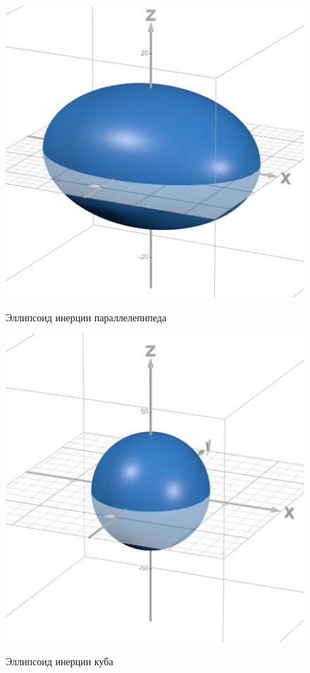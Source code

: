 \documentclass[a4paper,12pt]{article} %
\begin{document}
\begin{enumerate}
\begin{figure} [H] \center
	\includegraphics[scale=0.5]{data/elipse.png}
	\label{pic:4} \caption[Рис. 4]{Эллипсоид инерции параллелепипеда}
	\includegraphics[scale=0.5]{data/elipse 2.png}
	\label{pic:5} \caption[Рис. 5]{Эллипсоид инерции куба}
\end{figure}




\end{enumerate}
\end{document}
